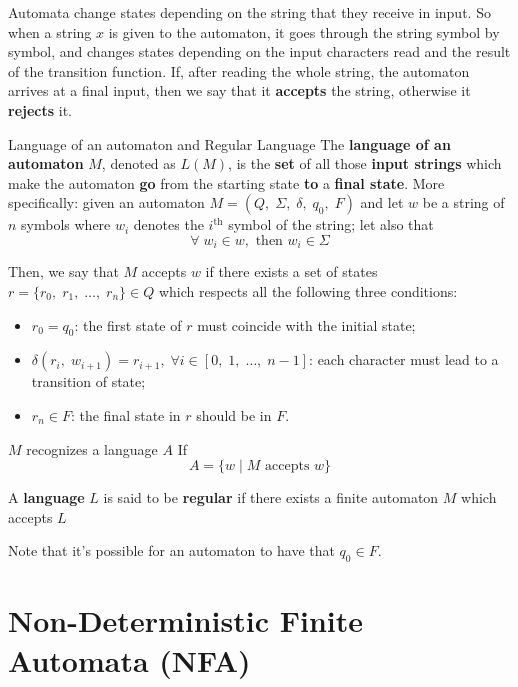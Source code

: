 \noindent Automata change states depending on the string that they receive in input. So when a string $x$ is given to the automaton, it goes through the string symbol by symbol, and changes states depending on the input characters read and the result of the transition function. If, after reading the whole string, the automaton arrives at a final input, then we say that it \textbf{accepts} the string, otherwise it \textbf{rejects} it.

\begin{definition}{Language of an automaton and Regular Language}
    The \textbf{language of an automaton} $M$, denoted as $L(M)$, is the \textbf{set} of all those \textbf{input strings} which make the automaton \textbf{go} from the starting state \textbf{to} a \textbf{final state}.
    \nwl
    \noindent More specifically: given an automaton $M = (Q, \; \Sigma, \; \delta, \; q_{0}, \; F)$ and let $w$ be a string of $n$ symbols where $w_i$ denotes the $i^\text{th}$ symbol of the string; let also that
    \[ \forall \; w_{i} \in w, \text{ then } w_{i} \in \Sigma \]
    
    \noindent Then, we say that $M$ accepts $w$ if there exists a set of states $r = \{ r_{0}, \; r_{1}, \; \dots, \; r_{n} \} \in Q$ which respects all the following three conditions:
    \begin{itemize}
        \item $r_0 = q_0$: the first state of $r$ must coincide with the initial state;
        \item $\delta(r_{i}, \; w_{i + 1}) = r_{i + 1}, \; \forall  i \in [0, \; 1, \; \dots, \; n-1]$: each character must lead to a transition of state;
        \item $r_{n} \in F$: the final state in $r$ should be in $F$.
    \end{itemize}
    
    \noindent $M$ recognizes a language $A$ If
    \[ A = \{ w \; | \; M \text{ accepts } w \} \]

    \noindent A \textbf{language} $L$ is said to be \textbf{regular} if there exists a finite automaton $M$ which accepts $L$
\end{definition}

\noindent Note that it's possible for an automaton to have that $q_{0} \in F$.

\section{Non-Deterministic Finite Automata (NFA)}

